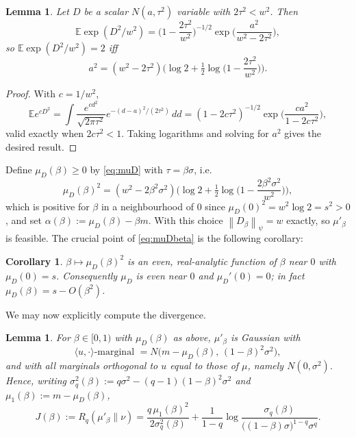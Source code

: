 \documentclass[10pt,a4paper]{amsart}
\newtheorem{lemma}[theorem]{Lemma}
\newtheorem{corollary}[theorem]{Corollary}
\newcommand{\ee}{\mathbb{E}}
\def\half{{\tfrac12}}
\newcommand{\norm}[1]{\left\lVert#1\right\rVert}
\numberwithin{equation}{section}
\begin{document}
\begin{lemma}\label{lem:budget}
Let $D$ be a scalar $N(a,\tau^2)$ variable with $2\tau^2<w^2$. Then
$$\ee\exp(D^2/w^2)=\Big(1-\frac{2\tau^2}{w^2}\Big)^{-1/2}\exp\Big(\frac{a^2}{w^2-2\tau^2}\Big),$$
so $\ee\exp(D^2/w^2)=2$ iff
\begin{equation}\label{eq:muD}
a^2=(w^2-2\tau^2)\Big(\log 2+\half\log\Big(1-\frac{2\tau^2}{w^2}\Big)\Big).
\end{equation}
\end{lemma}

\begin{proof}
With $c=1/w^2$,
$$\ee e^{cD^2}=\int \frac{e^{cd^2}}{\sqrt{2\pi\tau^2}}e^{-(d-a)^2/(2\tau^2)}\,dd
=(1-2c\tau^2)^{-1/2}\exp\Big(\frac{ca^2}{1-2c\tau^2}\Big),$$
valid exactly when $2c\tau^2<1$. Taking logarithms and solving for $a^2$ gives the desired result.
\end{proof}

Define $\mu_D(\beta)\ge0$ by \eqref{eq:muD} with $\tau=\beta\sigma$, i.e.
\begin{equation}\label{eq:muDbeta}
\mu_D(\beta)^2=(w^2-2\beta^2\sigma^2)\Big(\log 2+\half\log\Big(1-\frac{2\beta^2\sigma^2}{w^2}\Big)\Big),
\end{equation}
which is positive for $\beta$ in a neighbourhood of $0$ since $\mu_D(0)^2=w^2\log 2=s^2>0$, and set $\alpha(\beta):=\mu_D(\beta)-\beta m$. With this choice $\norm{D_\beta}_\psi=w$ exactly, so $\mu'_\beta$ is feasible. The crucial point of \eqref{eq:muDbeta} is the following corollary:

\begin{corollary}\label{cor:even}
$\beta\mapsto\mu_D(\beta)^2$ is an even, real-analytic function of $\beta$ near $0$ with $\mu_D(0)=s$. Consequently $\mu_D$ is even near $0$ and $\mu_D'(0)=0$; in fact $\mu_D(\beta)=s-O(\beta^2)$.
\end{corollary}

We may now explicitly compute the divergence.

\begin{lemma}\label{lem:pushforward}
For $\beta\in[0,1)$ with $\mu_D(\beta)$ as above, $\mu'_\beta$ is Gaussian with
$$\langle u,\cdot\rangle\text{-marginal }=N\big(m-\mu_D(\beta),\,(1-\beta)^2\sigma^2\big),$$
and with all marginals orthogonal to $u$ equal to those of $\mu$, namely $N(0,\sigma^2)$. Hence, writing $\sigma_q^2(\beta):=q\sigma^2-(q-1)(1-\beta)^2\sigma^2$ and $\mu_1(\beta):=m-\mu_D(\beta)$,
\begin{equation}\label{eq:J}
J(\beta):=R_q(\mu'_\beta\|\nu)=\frac{q\,\mu_1(\beta)^2}{2\sigma_q^2(\beta)}+\frac{1}{1-q}\log\frac{\sigma_q(\beta)}{\big((1-\beta)\sigma\big)^{1-q}\sigma^{q}}.
\end{equation}
\end{lemma}
\end{document}
